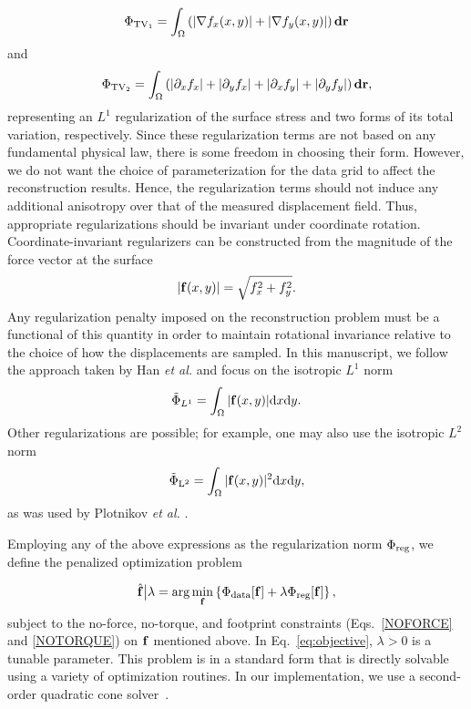 \documentclass[aps,prl,reprint,groupedaddress,twocolumn]{revtex4-1}
\def\d{{\bf d}}
\def\dd{\mbox{d}}
\def\f{{\bf f}}
\def\r{{\bf r}}
\newcommand{\remove}{\deleted}
\begin{document}
\begin{equation}
 \Phi_{{\rm TV}_1} = \int_\Omega \left( \vert\nabla f_{x}(x,y) \vert +
 \vert\nabla f_{y}(x,y) \vert\right)\d\r
 \label{eq:PhiTV1}
\end{equation}
and
\begin{equation}
\Phi_{{\rm TV}_2} = \int_\Omega \left(\vert\partial_x f_{x}\vert 
+ \vert\partial_y f_{x}\vert + \vert\partial_x f_{y}\vert
+ \vert\partial_y f_{y}\vert\right)\d\r,
 \label{eq:PhiTV2}
\end{equation}
%
representing an $L^{1}$ regularization of the surface stress and two
forms of its total variation, respectively.  Since these
regularization terms are not based on any fundamental physical law,
there is some freedom \remove{of} in choosing their form.  However, we do not
want the choice of parameterization for the data grid to affect the
reconstruction results. Hence, the regularization terms should not
induce any additional anisotropy over that of the measured displacement field.
Thus, appropriate regularizations should be invariant under coordinate
rotation. Coordinate-invariant regularizers can be constructed
from the magnitude of the force vector at the surface
\begin{equation}
\vert\f(x,y) \vert  = \sqrt{f_{x}^{2} + f_{y}^{2}}.
\end{equation}
%
Any regularization penalty imposed on the reconstruction problem must
be a functional of this quantity in order to maintain rotational
invariance relative to the choice of how the displacements are
sampled.  In this manuscript, we follow the approach taken by Han
\textit{et al.} \cite{DANUSER} and focus on the isotropic $L^1$ norm
\begin{equation}
\tilde{\Phi}_{L^{1}} = \int_\Omega \vert\f(x,y) \vert \dd x\dd y.
\label{eq:mag}
\end{equation}
%
Other regularizations are possible; for example, one may also use the isotropic $L^2$ norm
%
\begin{equation}
\tilde{\Phi}_{\rm L^2} =  
 \int_\Omega \vert\f(x,y) \vert^2 \dd x\dd y,
\label{eq:L2}
\end{equation}
as was used by Plotnikov \textit{et al.} \cite{WATERMAN}.

Employing any of the above expressions as the regularization norm
$\Phi_{\rm reg}$, we define the penalized optimization problem

\begin{equation}
\hat{\f} \big\vert \lambda = \arg\min_{\f} \left\{ \Phi_{\textrm{data}}[\f] + 
\lambda\Phi_{\textrm{reg}}[\f] \right\},
\label{eq:objective}
\end{equation}
%
subject to the no-force, no-torque, and footprint constraints
(Eqs.~\ref{NOFORCE} and \ref{NOTORQUE}) on $\f$ mentioned above.
In Eq.~\ref{eq:objective}, $\lambda>0$ is a tunable parameter. This
problem is in a standard form that is directly solvable using a
variety of optimization routines.  In our implementation, we use a
second-order quadratic cone solver~\cite{cvxpy}.
\end{document}
